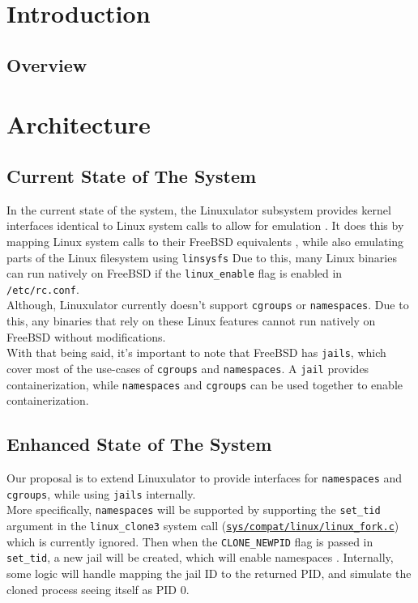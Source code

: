 \documentclass[12pt, dvipsnames, a4paper]{article}
\begin{document}
\section{Introduction}
\lipsum[1]

\subsection{Overview}
\lipsum[1]

\section{Architecture}
\subsection{Current State of The System}

In the current state of the system, the Linuxulator subsystem provides kernel
interfaces identical to Linux system calls to allow for emulation \cite{linuxbinarycompat}.
It does this by mapping Linux system calls to their FreeBSD equivalents \cite{linuxulator},
while also emulating parts of the Linux filesystem using \texttt{linsysfs} \cite{linsysfs}
Due to this, many Linux binaries can run natively on FreeBSD if the
\texttt{linux\_enable} flag is enabled in \texttt{/etc/rc.conf}.\\

Although, Linuxulator currently doesn't support \texttt{cgroups} or \texttt{namespaces}.
Due to this, any binaries that rely on these Linux features cannot run
natively on FreeBSD without modifications.\\

With that being said, it's important to note that FreeBSD has \texttt{jails},
which cover most of the use-cases of \texttt{cgroups} and \texttt{namespaces}.
A \texttt{jail} provides containerization, while \texttt{namespaces} and \texttt{cgroups}
can be used together to enable containerization.

\subsection{Enhanced State of The System}

Our proposal is to extend Linuxulator to provide interfaces for \texttt{namespaces}
and \texttt{cgroups}, while using \texttt{jails} internally.\\

More specifically, \texttt{namespaces} will be supported by supporting
the \texttt{set\_tid} argument in the \texttt{linux\_clone3} system call (\href{https://github.com/freebsd/freebsd-src/blob/953efa5b200f060564a090ab71b3d7f614a35e3f/sys/compat/linux/linux_fork.c#L398}{\texttt{sys/compat/linux/linux\_fork.c}})
which is currently ignored. Then when the \texttt{CLONE\_NEWPID} flag is passed in
\texttt{set\_tid}, a new jail will be created, which will enable
namespaces \cite{clone}. Internally, some logic will handle mapping the jail ID to the
returned PID, and simulate the cloned process seeing itself as PID 0.\\
\end{document}

